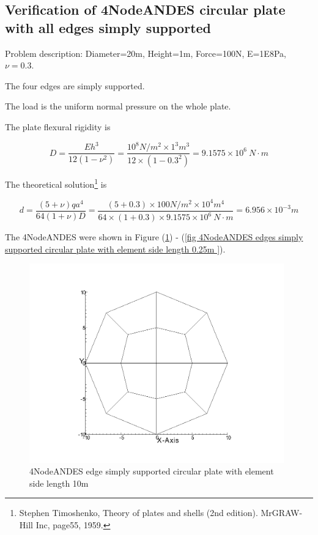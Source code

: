 \documentclass[fleqn,11pt,letter]{article}
\begin{document}
\newpage
\subsection{Verification of 4NodeANDES circular plate with all edges simply supported}


Problem description: Diameter=20m, Height=1m, Force=100N, E=1E8Pa, $\nu=0.3$. 

The four edges are simply supported. 

The load is the uniform normal pressure on the whole plate. 


The plate flexural rigidity is 

\begin{equation}
  D=\frac{Eh^3}{12(1-\nu^2)}=\frac{10^8 N/m^2 \times 1^3 m^3 }{12 \times (1-0.3^2) }= 9.1575 \times 10^6 \ N\cdot m
\end{equation}

The theoretical solution\footnote{Stephen Timoshenko, Theory of plates and shells (2nd edition). MrGRAW-Hill Inc, page55, 1959.} is 

\begin{equation}
  d= \frac{(5+\nu)  q a^4}{64(1+\nu) D}=\frac{(5+0.3)\times 100 N/m^2 \times 10^4 m^4}{64\times(1+0.3) \times 9.1575 \times 10^6 \ N\cdot m}=6.956\times 10^{-3} m
\end{equation}


The 4NodeANDES were shown in Figure (\ref{fig 4NodeANDES edges simply supported circular plate with element side length 10m }) - (\ref{fig 4NodeANDES edges simply supported circular plate with element side length 0.25m }). 



\begin{figure}[H]
  \centering
  \includegraphics[width=11cm]{../Figure_files/4NodeANDES/circular_plate1.png}
  \caption{4NodeANDES edge simply supported circular plate with element side length 10m }
  \label{fig 4NodeANDES edges simply supported circular plate with element side length 10m }
\end{figure}
\end{document}
